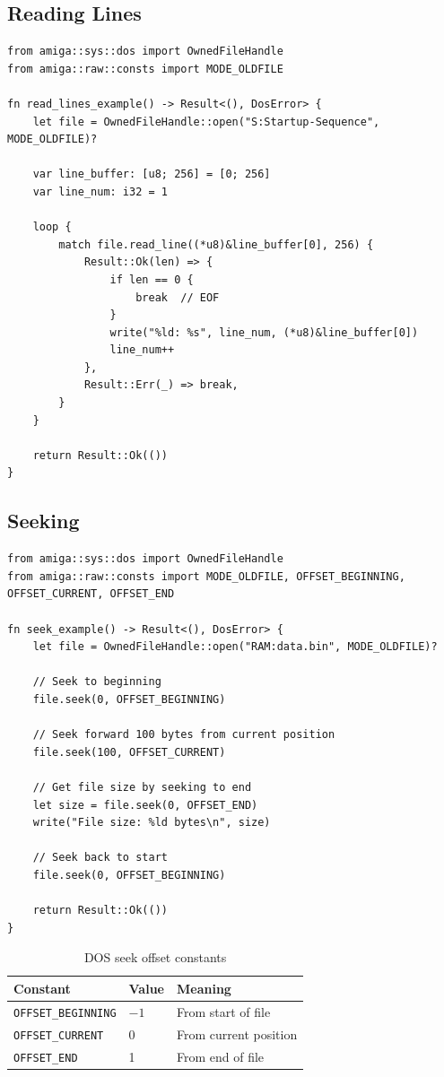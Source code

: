 \subsection{Reading Lines}

\begin{lstlisting}
from amiga::sys::dos import OwnedFileHandle
from amiga::raw::consts import MODE_OLDFILE

fn read_lines_example() -> Result<(), DosError> {
    let file = OwnedFileHandle::open("S:Startup-Sequence", MODE_OLDFILE)?

    var line_buffer: [u8; 256] = [0; 256]
    var line_num: i32 = 1

    loop {
        match file.read_line((*u8)&line_buffer[0], 256) {
            Result::Ok(len) => {
                if len == 0 {
                    break  // EOF
                }
                write("%ld: %s", line_num, (*u8)&line_buffer[0])
                line_num++
            },
            Result::Err(_) => break,
        }
    }

    return Result::Ok(())
}
\end{lstlisting}

\subsection{Seeking}

\begin{lstlisting}
from amiga::sys::dos import OwnedFileHandle
from amiga::raw::consts import MODE_OLDFILE, OFFSET_BEGINNING, OFFSET_CURRENT, OFFSET_END

fn seek_example() -> Result<(), DosError> {
    let file = OwnedFileHandle::open("RAM:data.bin", MODE_OLDFILE)?

    // Seek to beginning
    file.seek(0, OFFSET_BEGINNING)

    // Seek forward 100 bytes from current position
    file.seek(100, OFFSET_CURRENT)

    // Get file size by seeking to end
    let size = file.seek(0, OFFSET_END)
    write("File size: %ld bytes\n", size)

    // Seek back to start
    file.seek(0, OFFSET_BEGINNING)

    return Result::Ok(())
}
\end{lstlisting}

\begin{table}[h]
\centering
\begin{tabular}{lll}
\textbf{Constant} & \textbf{Value} & \textbf{Meaning} \\
\hline
\texttt{OFFSET\_BEGINNING} & $-1$ & From start of file \\
\texttt{OFFSET\_CURRENT} & 0 & From current position \\
\texttt{OFFSET\_END} & 1 & From end of file \\
\end{tabular}
\caption{DOS seek offset constants}
\end{table}

